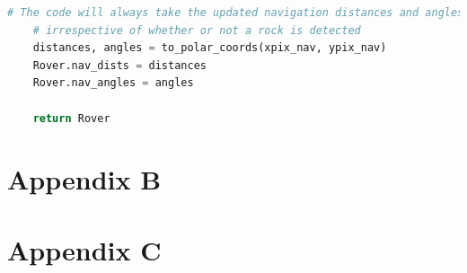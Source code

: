 \documentclass[a4paper]{article}
\begin{document}
\begin{lstlisting}[language=Python]
    # The code will always take the updated navigation distances and angles
    # irrespective of whether or not a rock is detected
    distances, angles = to_polar_coords(xpix_nav, ypix_nav)
    Rover.nav_dists = distances
    Rover.nav_angles = angles
    
    return Rover
\end{lstlisting}

\section{Appendix B}
\section{Appendix C}
\end{document}
